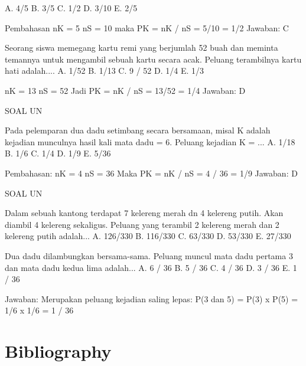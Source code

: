 \documentclass[11pt,fleqn]{book} %
\begin{document}
{{A. 4/5
B. 3/5
C. 1/2
D. 3/10
E. 2/5

\vspace{0.5in}


Pembahasan
nK = 5
nS = 10
maka PK = nK / nS = 5/10 = 1/2
Jawaban: C

\vspace{0.5in}

Seorang siswa memegang kartu remi yang berjumlah 52 buah dan meminta temannya untuk mengambil sebuah kartu secara acak. Peluang terambilnya kartu hati adalah....
A. 1/52
B. 1/13
C. 9 / 52
D. 1/4
E. 1/3

\vspace{0.5in}

nK = 13
nS = 52
Jadi PK = nK / nS = 13/52 = 1/4
Jawaban: D

\vspace{0.5in}
SOAL UN 

Pada pelemparan dua dadu setimbang secara bersamaan, misal K adalah kejadian munculnya hasil kali mata dadu = 6. Peluang kejadian K = ...
A. 1/18
B. 1/6
C. 1/4
D. 1/9
E. 5/36

\vspace{0.5in}

Pembahasan: 
nK = 4
nS = 36
Maka PK = nK / nS = 4 / 36 = 1/9
Jawaban: D

\vspace{0.5in}
SOAL UN

Dalam sebuah kantong terdapat 7 kelereng merah dn 4 kelereng putih. Akan diambil 4 kelereng sekaligus. Peluang yang terambil 2 kelereng merah dan 2 kelereng putih adalah...
A. 126/330
B. 116/330
C. 63/330
D. 53/330
E. 27/330
\vspace{0.5in}


Dua dadu dilambungkan bersama-sama. Peluang muncul mata dadu pertama 3 dan mata dadu kedua lima adalah...
A. 6 / 36
B. 5 / 36
C. 4 / 36
D. 3 / 36
E. 1 / 36

\vspace{0.5in}

Jawaban:
Merupakan peluang kejadian saling lepas:
P(3 dan 5) = P(3) x P(5) = 1/6 x 1/6 = 1 / 36








\chapter*{Bibliography}
}}
\end{document}
